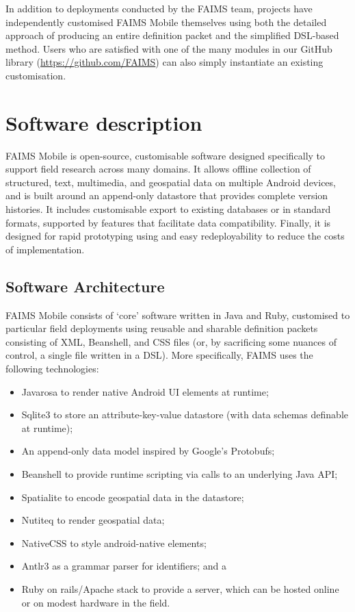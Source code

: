 \documentclass[preprint,12pt, a4paper]{elsarticle}
\begin{document}
In addition to deployments conducted by the FAIMS team, projects have independently customised FAIMS Mobile themselves using both the detailed approach of producing an entire definition packet and the simplified DSL-based method\cite{Good2016-gf, Kiley2016-sf}. Users who are satisfied with one of the many modules in our GitHub library (\url{https://github.com/FAIMS}) can also simply instantiate an existing customisation.

\section{Software description}


FAIMS Mobile is open-source, customisable software designed specifically to support field research across many domains. It allows offline collection of structured, text, multimedia, and geospatial data on multiple Android devices, and is built around an append-only datastore that provides complete version histories. It includes customisable export to existing databases or in standard formats, supported by features that facilitate data compatibility. Finally, it is designed for rapid prototyping using and easy redeployability to reduce the costs of implementation. 


\subsection{Software Architecture}



FAIMS Mobile consists of `core' software written in Java and Ruby, customised to particular field deployments using reusable and sharable definition packets consisting of XML, Beanshell, and CSS files (or, by sacrificing some nuances of control, a single file written in a DSL). More specifically, FAIMS uses the following technologies:

\begin{itemize}
\item Javarosa to render native Android UI elements at runtime;
\item Sqlite3 to store an attribute-key-value datastore (with data schemas definable at runtime);
\item An append-only data model inspired by Google's Protobufs;
\item Beanshell to provide runtime scripting via calls to an underlying Java API;
\item Spatialite to encode geospatial data in the datastore;
\item Nutiteq to render geospatial data;
\item NativeCSS to style android-native elements;
\item Antlr3 as a grammar parser for identifiers; and a
\item Ruby on rails/Apache stack to provide a server, which can be hosted online or on modest hardware in the field.
\end{itemize}
\end{document}
